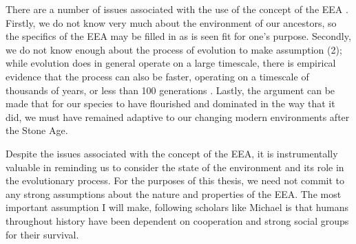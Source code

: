 There are a number of issues associated with the use of the concept of the EEA \citep{LB02}. Firstly, we do not know very much about the environment of our ancestors, so the specifics of the EEA may be filled in as is seen fit for one's purpose. Secondly, we do not know enough about the process of evolution to make assumption (2); while evolution does in general operate on a large timescale, there is empirical evidence
that the process can also be faster, operating on a timescale of thousands of years, or less than 100 generations \citep[pp.~190--191 and references therein]{LB02}. Lastly, the argument can be made that for our species to have flourished and dominated in the way that it did, we must have remained adaptive to our changing modern environments after the Stone Age.

Despite the issues associated with the concept of the EEA, it is instrumentally valuable in reminding us to consider the state of the environment and its role in the evolutionary process. For the purposes of this thesis, we need not commit to any strong assumptions about the nature and properties of the EEA. The most important assumption I will make, following scholars like Michael \citet[][see also \cref{sec:comm:cooperation}]{Tomasello09} is that humans throughout history have been dependent on cooperation and strong social groups for their survival.

